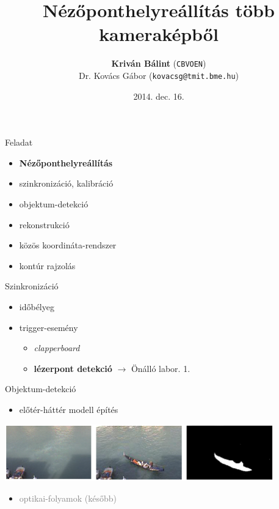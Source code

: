 \documentclass[17pt,xcolor=x11names]{beamer}
\title[Nézőponthelyreállítás]{Nézőponthelyreállítás több kameraképből}
\subtitle{}
\author[Kriván Bálint]{\textbf{Kriván Bálint} (\texttt{CBVOEN})\\[10pt]
\footnotesize Dr. Kovács Gábor (\texttt{kovacsg@tmit.bme.hu})}
\institute[BME]{}
\date{2014. dec. 16.}
\begin{document}
\begin{frame}\maketitle\end{frame}

\begin{frame}{Feladat}
\begin{itemize}
\item \textbf{Nézőponthelyreállítás} \\\vspace{10pt}
\item szinkronizáció, kalibráció
\item objektum-detekció
\item rekonstrukció
\item közös koordináta-rendszer
\item kontúr rajzolás
\end{itemize}
\end{frame}

\begin{frame}{Szinkronizáció}
\begin{itemize}
\item időbélyeg
\item trigger-esemény
\begin{itemize}
\item \textit{clapperboard}
\item \textbf{lézerpont detekció} $\rightarrow$ Önálló labor. 1.
\end{itemize}
\end{itemize}
\end{frame}

\begin{frame}{Objektum-detekció}
\begin{itemize}
\item előtér-háttér modell építés
\end{itemize}
\begin{center}
\includegraphics[width=330pt]{figures/mog.png}
\end{center}
\begin{itemize}
\item \textcolor{gray}{optikai-folyamok (később)}
\end{itemize}
\end{frame}
\end{document}
